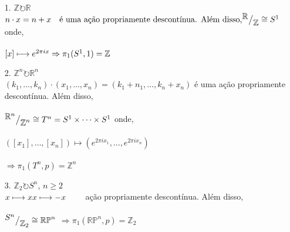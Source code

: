 \begin{ex}
\ 
	\begin{itemize}
    
        \item[1.] $\mathbb{Z}\circlearrowright\mathbb{R}$\\
            $n\cdot x = n+x \text{\ \ \  é uma ação propriamente descontínua. Além disso,} \\\\
            \mkern-18mu \quad{^{\textstyle \mathbb{R}}\big/_{\textstyle \mathbb{Z}}} \cong S^1$ onde,\\\\
            $[x]\longmapsto e^{2\pi ix}\\\\
            \Rightarrow \pi_1(S^1 , 1) = \mathbb{Z}$\\
            
	    \item[2.] $\mathbb{Z}^n\circlearrowright\mathbb{R}^n$\\
            $(k_1,\dots, k_n)\cdot(x_1,\dots,x_n) = (k_1+n_1,\dots,k_n+x_n)$ é uma ação propriamente descontínua. Além disso,\\\\
            $\mkern-18mu \quad{^{\textstyle \mathbb{R}^n}\big/_{\textstyle \mathbb{Z}^n}} \cong T^n = S^1\times\dots\times S^1$ onde,\\\\
            $([x_1],\dots,[x_n])\longmapsto (e^{2\pi ix_1},\dots,e^{2\pi ix_n})$\\\\
            $\Rightarrow \pi_1(T^n , p) = \mathbb{Z}^n$\\

        \item[3.] $\mathbb{Z}_2\circlearrowright S^n$, $n\geq2$\\
            $x\longmapsto x\\
             x\longmapsto -x$ \ \ \ \ ação propriamente descontínua. Além disso,\\\\
            $\mkern-18mu \quad{^{\textstyle S^n}\big/_{\textstyle \mathbb{Z}_2}} \cong \mathbb{RP}^n$
            $\Rightarrow \pi_1(\mathbb{RP}^n , p) = \mathbb{Z}_2$\\


\end{itemize}
\end{ex}
